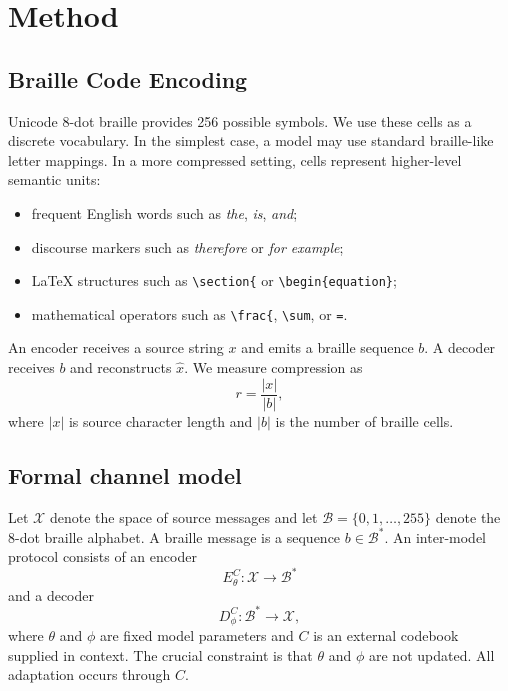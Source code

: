 \documentclass[11pt]{article}
\begin{document}
\section{Method}
\subsection{Braille Code Encoding}
Unicode 8-dot braille provides 256 possible symbols. We use these cells as a discrete vocabulary. In the simplest case, a model may use standard braille-like letter mappings. In a more compressed setting, cells represent higher-level semantic units:
\begin{itemize}[leftmargin=*]
  \item frequent English words such as \emph{the}, \emph{is}, \emph{and};
  \item discourse markers such as \emph{therefore} or \emph{for example};
  \item LaTeX structures such as \verb|\section{| or \verb|\begin{equation}|;
  \item mathematical operators such as \verb|\frac{|, \verb|\sum|, or \verb|=|.
\end{itemize}

An encoder receives a source string $x$ and emits a braille sequence $b$. A decoder receives $b$ and reconstructs $\hat{x}$. We measure compression as
\begin{equation}
  r = \frac{|x|}{|b|},
\end{equation}
where $|x|$ is source character length and $|b|$ is the number of braille cells.

\subsection{Formal channel model}
Let $\mathcal{X}$ denote the space of source messages and let $\mathcal{B} = \{0,1,\ldots,255\}$ denote the 8-dot braille alphabet. A braille message is a sequence $b \in \mathcal{B}^{*}$. An inter-model protocol consists of an encoder
\begin{equation}
  E_{\theta}^{C}: \mathcal{X} \rightarrow \mathcal{B}^{*}
\end{equation}
and a decoder
\begin{equation}
  D_{\phi}^{C}: \mathcal{B}^{*} \rightarrow \mathcal{X},
\end{equation}
where $\theta$ and $\phi$ are fixed model parameters and $C$ is an external codebook supplied in context. The crucial constraint is that $\theta$ and $\phi$ are not updated. All adaptation occurs through $C$.
\end{document}
